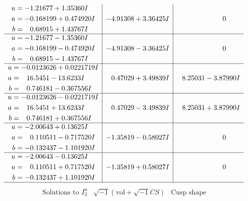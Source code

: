 \documentclass[1p]{elsarticle_modified}
\theoremstyle{definition}
\newcommand{\I}{\sqrt{-1}}
\begin{document}
$$\begin{array}{c|c|c}
\begin{aligned}
u &= -1.21677 + 1.35360 I \\
a &= -0.168199 + 0.474920 I \\
b &= \phantom{-}0.68915 + 1.43767 I\end{aligned}
 & -4.91308 + 3.36425 I & \phantom{-0.000000 } 0 \\ \hline\begin{aligned}
u &= -1.21677 - 1.35360 I \\
a &= -0.168199 - 0.474920 I \\
b &= \phantom{-}0.68915 - 1.43767 I\end{aligned}
 & -4.91308 - 3.36425 I & \phantom{-0.000000 } 0 \\ \hline\begin{aligned}
u &= -0.0123626 + 0.0221719 I \\
a &= \phantom{-}16.5451 - 13.6233 I \\
b &= \phantom{-}0.746181 - 0.367556 I\end{aligned}
 & \phantom{-}0.47029 + 3.49839 I & \phantom{-}8.25031 - 3.87990 I \\ \hline\begin{aligned}
u &= -0.0123626 - 0.0221719 I \\
a &= \phantom{-}16.5451 + 13.6233 I \\
b &= \phantom{-}0.746181 + 0.367556 I\end{aligned}
 & \phantom{-}0.47029 - 3.49839 I & \phantom{-}8.25031 + 3.87990 I \\ \hline\begin{aligned}
u &= -2.00643 + 0.13625 I \\
a &= \phantom{-}0.110511 - 0.717520 I \\
b &= -0.132437 - 1.101920 I\end{aligned}
 & -1.35819 - 0.58027 I & \phantom{-0.000000 } 0 \\ \hline\begin{aligned}
u &= -2.00643 - 0.13625 I \\
a &= \phantom{-}0.110511 + 0.717520 I \\
b &= -0.132437 + 1.101920 I\end{aligned}
 & -1.35819 + 0.58027 I & \phantom{-0.000000 } 0\\
 \hline 
 \end{array}$$\newpage$$\begin{array}{c|c|c}  
\text{Solutions to }I^u_{2}& \I (\text{vol} + \sqrt{-1}CS) & \text{Cusp shape}\\
 \hline 
\begin{aligned}

\end{aligned}
\end{array}$$
\end{document}
